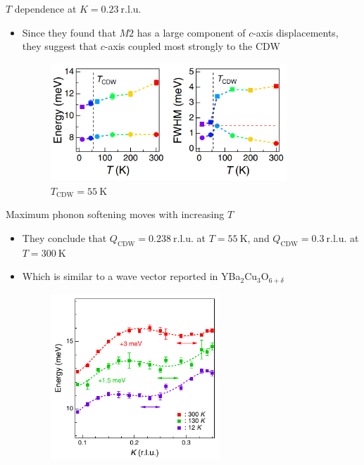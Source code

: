 \documentclass{beamer}
\begin{document}
\begin{frame}{$T$ dependence at $K = 0.23~\mathrm{r.l.u.}$}
\begin{itemize}
\item Since they found that $M2$ has a large component of $c$-axis displacements, they suggest that $c$-axis coupled most strongly to the CDW
\begin{figure}
\includegraphics[width=3.5in]{figs/exp_T_dependence.png}
\caption{\label{fig:exp_T_dependence} $T_{\text{CDW}} = 55~\mathrm{K}$}
\end{figure}
\end{itemize}
\end{frame}

\begin{frame}{Maximum phonon softening moves with increasing $T$}
\begin{itemize}
\item They conclude that $Q_{\text{CDW}} = 0.238~\mathrm{r.l.u.}$ at $T = 55~\mathrm{K}$, and $Q_{\text{CDW}} = 0.3~\mathrm{r.l.u.}$ at $T = 300~\mathrm{K}$
\item Which is similar to a wave vector reported in YBa$_2$Cu$_3$O$_{6 + \delta}$
\begin{figure}
\includegraphics[width=2.5in]{figs/exp_E_k_zoomed.pdf}
\caption{\label{fig:exp_E_k_zoomed} }
\end{figure}
\end{itemize}
\end{frame}
\end{document}
